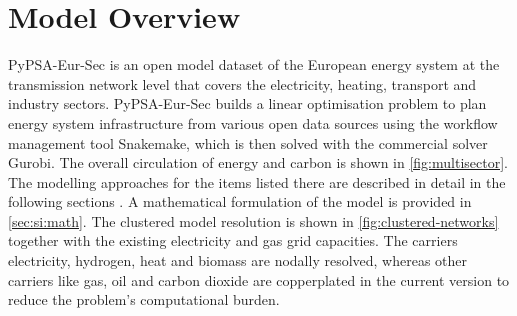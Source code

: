 \section{Model Overview}
\label{sec:si:model-overview}


PyPSA-Eur-Sec is an open model dataset of the European energy system at the
transmission network level that covers the electricity, heating, transport and
industry sectors. PyPSA-Eur-Sec builds a linear optimisation problem to plan
energy system infrastructure from various open data sources using the workflow
management tool Snakemake, which is then solved with the
commercial solver Gurobi. The overall circulation of energy and
carbon is shown in \cref{fig:multisector}. The modelling approaches for the
items listed there are described in detail in the following sections
. A mathematical
formulation of the model is provided in \cref{sec:si:math}. The clustered model
resolution is shown in \cref{fig:clustered-networks} together with the existing
electricity and gas grid capacities. The carriers electricity, hydrogen, heat
and biomass are nodally resolved, whereas other carriers like gas, oil and
carbon dioxide are copperplated in the current version to reduce the problem's
computational burden.
